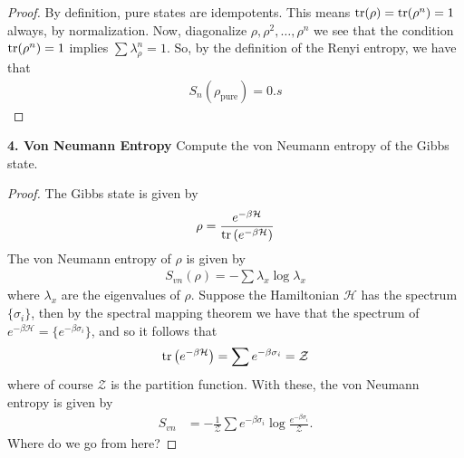 \documentclass{book}
\theoremstyle{definition}
\newcommand{\had}{\mathcal{H}}
\newcommand{\f}[2]{\frac{#1}{#2}}
\newcommand{\lp}{\left(}
\newcommand{\rp}{\right)}
\begin{document}
\begin{enumerate}
	\begin{proof}
		By definition, pure states are idempotents. This means $\tr(\rho) = \tr(\rho^n) = 1$ always, by normalization. Now, diagonalize $\rho, \rho^2, \dots, \rho^n$ we see that the condition $\tr(\rho^n) = 1$ implies $\sum \lambda_\rho^n = 1$. So, by the definition of the Renyi entropy, we have that 
		\begin{align}
		S_n(\rho_\text{pure}) = 0.
		s\end{align}
	\end{proof}
	
	
	
\end{enumerate}




\noindent \textbf{4. Von Neumann Entropy}
Compute the von Neumann entropy of the Gibbs state.


\begin{proof}
	The Gibbs state is given by
	\begin{align}
	\rho = \f{e^{-\beta \had}}{ \tr\lp  e^{-\beta \had} \rp }
	\end{align}
	The von Neumann entropy of $\rho$ is given by
	\begin{align}
	S_{vn}(\rho) = -\sum \lambda_x \log \lambda_x
	\end{align}
	where $\lambda_x$ are the eigenvalues of $\rho$. Suppose the Hamiltonian $\had$ has the spectrum $\{ \sigma_i \}$, then by the spectral mapping theorem we have that the spectrum of $e^{-\beta \had} = \{ e^{-\beta \sigma_i} \}$, and so it follows that
	\begin{align}
	\tr\lp e^{-\beta \had} \rp = \sum e^{-\beta \sigma_i} = \mathcal{Z}
	\end{align}
	where of course $\mathcal{Z}$ is the partition function. With these, the von Neumann entropy is given by
	\begin{align}
	S_{vn} 
	&= -\f{1}{\mathcal{Z}}\sum {e^{-\beta \sigma_i}}\log \f{e^{-\beta \sigma_i}}{\mathcal{Z}}.
	\end{align}
	Where do we go from here?
	
	
\end{proof}
\end{document}
